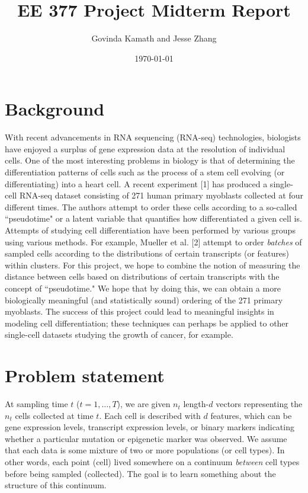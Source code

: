 \documentclass[11pt,onecolumn]{article}
\title{EE 377 Project Midterm Report}
\author{Govinda Kamath and Jesse Zhang}
\date{\today}
\begin{document}
\maketitle
 
\section{Background}
With recent advancements in RNA sequencing (RNA-seq) technologies, biologists have enjoyed a surplus of gene expression data at the resolution of individual cells. One of the most interesting problems in biology is that of determining the differentiation patterns of cells such as the process of a stem cell evolving (or differentiating) into a heart cell. A recent experiment [1] has produced a single-cell RNA-seq dataset consisting of 271 human primary myoblasts collected at four different times. The authors attempt to order these cells according to a so-called ``pseudotime" or a latent variable that quantifies how differentiated a given cell is. Attempts of studying cell differentiation have been performed by various groups using various methods. For example, Mueller et al. [2] attempt to order \textit{batches} of sampled cells according to the distributions of certain transcripts (or features) within clusters. For this project, we hope to combine the notion of measuring the distance between cells based on distributions of certain transcripts with the concept of ``pseudotime." We hope that by doing this, we can obtain a more biologically meaningful (and statistically sound) ordering of the 271 primary myoblasts. The success of this project could lead to meaningful insights in modeling cell differentiation; these techniques can perhaps be applied to other single-cell datasets studying the growth of cancer, for example.

\section{Problem statement}
At sampling time $t$ ($t = 1, \dots, T$), we are given $n_t$ length-$d$ vectors representing the $n_t$ cells collected at time $t$. Each cell is described with $d$ features, which can be gene expression levels, transcript expression levels, or binary markers indicating whether a particular mutation or epigenetic marker was observed. We assume that each data is some mixture of two or more populations (or cell types). In other words, each point (cell) lived somewhere on a continuum \textit{between} cell types before being sampled (collected). The goal is to learn something about the structure of this continuum. \\
\end{document}
